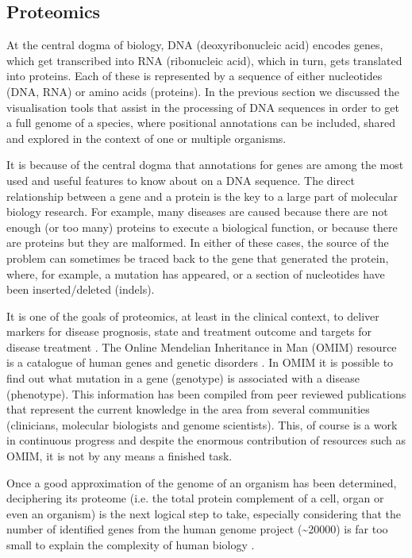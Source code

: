 \subsection{Proteomics}
At the central dogma of biology, DNA (deoxyribonucleic acid) encodes genes, which get transcribed into RNA (ribonucleic acid), which in turn, gets translated into proteins. Each of these is represented by a sequence of either nucleotides (DNA, RNA) or amino acids (proteins). In the previous section we discussed the visualisation tools that assist in the processing of DNA sequences in order to get a full genome of a species, where positional annotations can be included, shared and explored in the context of one or multiple organisms. 

It is because of the central dogma that annotations for genes are among the most used and useful features to know about on a DNA sequence. The direct relationship between a gene and a protein is the key to a large part of molecular biology research. For example, many diseases are caused because there are not enough (or too many) proteins to execute a biological function, or because there are proteins but they are malformed. In either of these cases, the source of the problem can sometimes be traced back to the gene that generated the protein, where, for example, a mutation has appeared, or a section of nucleotides have been inserted/deleted (indels). 

It is one of the goals of proteomics, at least in the clinical context, to deliver markers for disease prognosis, state and treatment outcome and targets for disease treatment \cite{MIS2007}. The Online Mendelian Inheritance in Man (OMIM) resource is a catalogue of human genes and genetic disorders \cite{AMB2014}. In OMIM it is possible to find out what mutation in a gene (genotype) is associated with a disease (phenotype). This information has been compiled from peer reviewed publications that represent the current knowledge in the area from several communities (clinicians, molecular biologists and genome scientists). This, of course is a work in continuous progress and despite the enormous contribution of resources such as OMIM, it is not by any means a finished task.

Once a good approximation of the genome of an organism has been determined, deciphering its proteome (i.e. the total protein complement of a cell, organ or even an organism) is the next logical step to take, especially considering that the number of identified genes from the human genome project (\textasciitilde20000) is far too small to explain the complexity of human biology \cite{PAN2008}.

